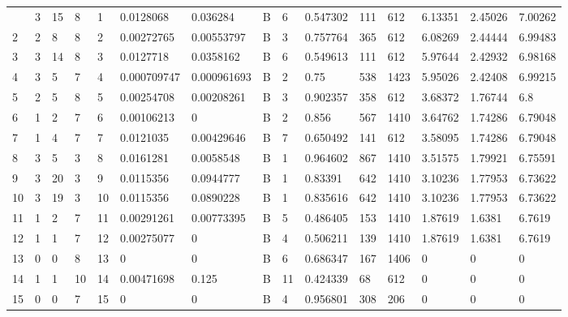 \begin{latin}
\begin{longtable}{lllllllllllllll}
   & 3                  & 15            & 8          & 1              & 0.0128068            & 0.036284               & B          & 6                    & 0.547302             & 111                     & 612               & 6.13351                  & 2.45026                & 7.00262               \\
	2   & 2  & 8   & 8  & 2   & 0.00272765     & 0.00553797     & B & 3  & 0.757764 & 365  & 612  & 6.08269 & 2.44444 & 6.99483 \\
	3   & 3  & 14  & 8  & 3   & 0.0127718      & 0.0358162      & B & 6  & 0.549613 & 111  & 612  & 5.97644 & 2.42932 & 6.98168 \\
	4   & 3  & 5   & 7  & 4   & 0.000709747    & 0.000961693    & B & 2  & 0.75     & 538  & 1423 & 5.95026 & 2.42408 & 6.99215 \\
	5   & 2  & 5   & 8  & 5   & 0.00254708     & 0.00208261     & B & 3  & 0.902357 & 358  & 612  & 3.68372 & 1.76744 & 6.8     \\
	6   & 1  & 2   & 7  & 6   & 0.00106213     & 0              & B & 2  & 0.856    & 567  & 1410 & 3.64762 & 1.74286 & 6.79048 \\
	7   & 1  & 4   & 7  & 7   & 0.0121035      & 0.00429646     & B & 7  & 0.650492 & 141  & 612  & 3.58095 & 1.74286 & 6.79048 \\
	8   & 3  & 5   & 3  & 8   & 0.0161281      & 0.0058548      & B & 1  & 0.964602 & 867  & 1410 & 3.51575 & 1.79921 & 6.75591 \\
	9   & 3  & 20  & 3  & 9   & 0.0115356      & 0.0944777      & B & 1  & 0.83391  & 642  & 1410 & 3.10236 & 1.77953 & 6.73622 \\
	10  & 3  & 19  & 3  & 10  & 0.0115356      & 0.0890228      & B & 1  & 0.835616 & 642  & 1410 & 3.10236 & 1.77953 & 6.73622 \\
	11  & 1  & 2   & 7  & 11  & 0.00291261     & 0.00773395     & B & 5  & 0.486405 & 153  & 1410 & 1.87619 & 1.6381  & 6.7619  \\
	12  & 1  & 1   & 7  & 12  & 0.00275077     & 0              & B & 4  & 0.506211 & 139  & 1410 & 1.87619 & 1.6381  & 6.7619  \\
	13  & 0  & 0   & 8  & 13  & 0              & 0              & B & 6  & 0.686347 & 167  & 1406 & 0       & 0       & 0       \\
	14  & 1  & 1   & 10 & 14  & 0.00471698     & 0.125          & B & 11 & 0.424339 & 68   & 612  & 0       & 0       & 0       \\
	15  & 0  & 0   & 7  & 15  & 0              & 0              & B & 4  & 0.956801 & 308  & 206  & 0       & 0       & 0       \\

\end{longtable}
\end{latin}
